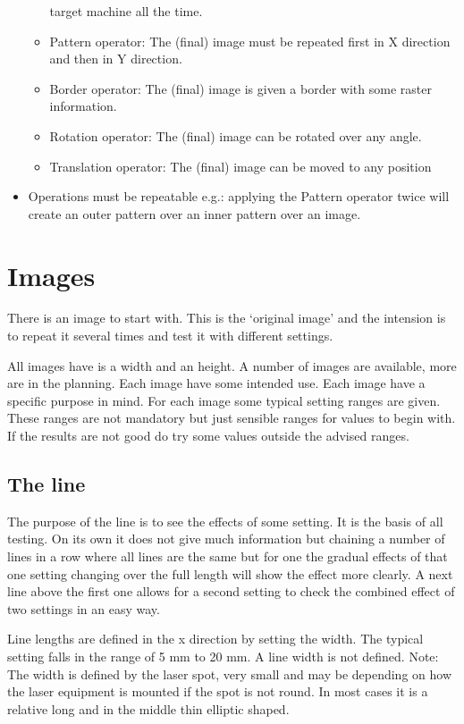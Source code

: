 \begin{itemize}
\begin{itemize}
                    target machine all the time.
              \item Pattern operator: The (final) image must be repeated first in X direction and then in Y direction.
              \item Border operator: The (final) image is given a border with some raster information.
              \item Rotation operator: The (final) image can be rotated  over any angle.
              \item Translation operator: The (final) image can be moved to any position
          \end{itemize}
    \item Operations must be repeatable e.g.: applying the Pattern operator twice will create an outer pattern over
          an inner pattern over an image.
\end{itemize}

\section{Images}
There is an image to start with. This is the `original image' and the intension is to repeat it
several times and test it with different settings.

All images have is a width and an height. A number of images are available, more are in the planning.
Each image have some intended use. Each image have a specific purpose in mind. For each image some typical setting ranges
are given. These ranges are not mandatory but just sensible ranges for values to begin with. If the results are not good
do try some values outside the advised ranges.

\subsection{The line}
The purpose of the line is to see the effects of some setting. It is the basis
of all testing.
On its own it does not give much information but chaining a number of lines in a row where all lines are the same but
for one the gradual effects of that one setting changing over the full length  will show the effect more clearly.
A next line above the first one  allows for a second setting to check the combined effect of two settings in an easy way.

Line lengths are defined in the x direction by setting the width. The typical setting falls in the range of 5 mm to 20 mm.
A line width is not defined. Note: The width is defined by the laser spot, very small and may be depending on how the laser
equipment is mounted if the spot is not round. In most cases it is a relative long and in the middle thin elliptic shaped.

